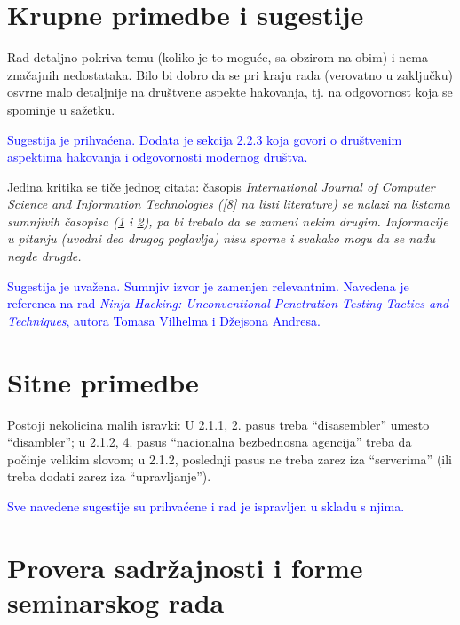 \documentclass[a4paper]{report}
\newcommand{\odgovor}[1]{\textcolor{blue}{#1}}
\begin{document}
\section{Krupne primedbe i sugestije}
Rad detaljno pokriva temu (koliko je to moguće, sa obzirom na obim) i nema značajnih nedostataka. Bilo bi dobro da se pri kraju rada (verovatno u zaključku) osvrne malo detaljnije na društvene aspekte hakovanja, tj. na odgovornost koja se spominje u sažetku.

\odgovor{Sugestija je prihvaćena. Dodata je sekcija 2.2.3 koja govori o društvenim aspektima hakovanja i odgovornosti modernog društva.}

Jedina kritika se tiče jednog citata: časopis \em{International Journal of Computer Science and Information Technologies }\em ([8] na listi literature) se nalazi na listama sumnjivih časopisa (\href{https://predatoryjournals.com/journals/}{1} i \href{https://beallslist.weebly.com/standalone-journals.html}{2}), pa bi trebalo da se zameni nekim drugim. Informacije u pitanju (uvodni deo drugog poglavlja) nisu sporne i svakako mogu da se nađu negde drugde.

\odgovor{Sugestija je uvažena. Sumnjiv izvor je zamenjen relevantnim. Navedena je referenca na rad \textit{Ninja Hacking: Unconventional Penetration Testing Tactics and Techniques}, autora Tomasa Vilhelma i Džejsona Andresa.} 

\section{Sitne primedbe}
Postoji nekolicina malih isravki: U 2.1.1, 2. pasus treba ``disasembler'' umesto ``disambler''; u 2.1.2, 4. pasus ``nacionalna bezbednosna agencija'' treba da počinje velikim slovom; u 2.1.2, poslednji pasus ne treba zarez iza ``serverima'' (ili treba dodati zarez iza ``upravljanje'').

\odgovor{Sve navedene sugestije su prihvaćene i rad je ispravljen u skladu s njima.}


\section{Provera sadržajnosti i forme seminarskog rada}
\end{document}
